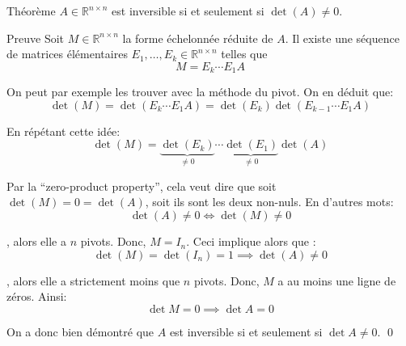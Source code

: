 \documentclass[a4paper]{article}
\begin{document}
\begin{parag}{Théorème}
    $A \in \mathbb{R}^{n \times n}$ est inversible si et seulement si $\det\left(A\right) \neq 0$.

    \begin{subparag}{Preuve}
        Soit $M \in \mathbb{R}^{n \times n}$ la forme échelonnée réduite de $A$. Il existe une séquence de matrices élémentaires $E_1, \ldots, E_k \in \mathbb{R}^{n \times n}$ telles que
        \[M = E_k \cdots E_1 A \]

        On peut par exemple les trouver avec la méthode du pivot. On en déduit que:
        \[\det\left(M\right) = \det\left(E_k \cdots E_1 A\right) = \det\left(E_k\right)\det\left(E_{k-1} \cdots E_1 A\right)\]

        En répétant cette idée:
        \[\det\left(M\right) = \underbrace{\det\left(E_k\right)}_{\neq 0}\cdots\underbrace{\det\left(E_1\right)}_{\neq 0}\det\left(A\right)\]

        Par la ``zero-product property'', cela veut dire que soit $\det\left(M\right) = 0 = \det\left(A\right)$, soit ils sont les deux non-nuls. En d'autres mots:
        \[\det\left(A\right) \neq 0 \iff \det\left(M\right) \neq 0\]

        , alors elle a $n$ pivots. Donc, $M = I_n$. Ceci implique alors que :
        \[\det\left(M\right) = \det\left(I_n\right) = 1 \implies \det\left(A\right) \neq 0\]

        , alors elle a strictement moins que $n$ pivots. Donc, $M$ a au moins une ligne de zéros. Ainsi:
        \[\det M = 0 \implies \det A = 0\]

        \vspace{1em}

        On a donc bien démontré que $A$ est inversible si et seulement si $\det A \neq 0$.
        \qed
    \end{subparag}

\end{parag}
\end{document}
